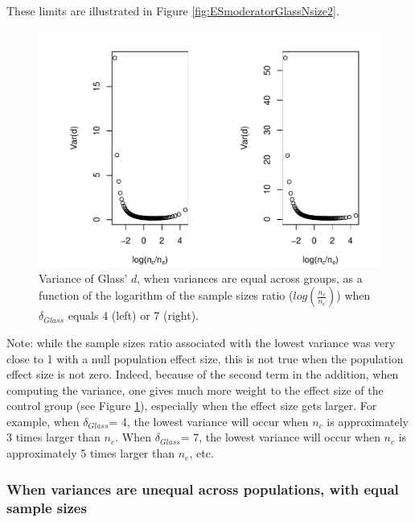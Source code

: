 \documentclass[
  english,
  man,mask]{apa6}
\begin{document}
These limits are illustrated in Figure \ref{fig:ESmoderatorGlassNsize2}.

\begin{figure}
\centering
\includegraphics{Theoretical-Variance-of-all-estimators-as-a-function-of-population-parameters_files/figure-latex/varglasshomNratiobis2-1.pdf}
\caption{\label{fig:varglasshomNratiobis2}Variance of Glass' \(d\), when variances are equal across groups, as a function of the logarithm of the sample sizes ratio (\(log\left(\frac{n_c}{n_e} \right)\)) when \(\delta_{Glass}\) equals 4 (left) or 7 (right).}
\end{figure}

Note: while the sample sizes ratio associated with the lowest variance was very close to 1 with a null population effect size, this is not true when the population effect size is not zero. Indeed, because of the second term in the addition, when computing the variance, one gives much more weight to the effect size of the control group (see Figure \ref{fig:varglasshomNratiobis2}), especially when the effect size gets larger. For example, when \(\delta_{Glass}\)= 4, the lowest variance will occur when \(n_c\) is approximately 3 times larger than \(n_e\). When \(\delta_{Glass}\)= 7, the lowest variance will occur when \(n_c\) is approximately 5 times larger than \(n_e\), etc.

\hypertarget{when-variances-are-unequal-across-populations-with-equal-sample-sizes}{%
\subsubsection{When variances are unequal across populations, with equal sample sizes}\label{when-variances-are-unequal-across-populations-with-equal-sample-sizes}}
\end{document}
